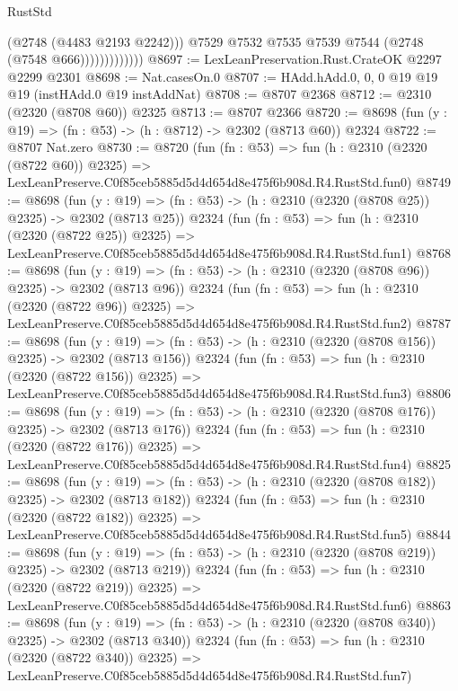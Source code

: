 \begin{lexlean}{RustStd}
\begin{coremodule}
                            (@2748 (@4483 @2193 @2242)))
                          @7529
                          @7532
                          @7535
                          @7539
                          @7544
                          (@2748 (@7548 @666)))))))))))))
@8697 := LexLeanPreservation.Rust.CrateOK @2297 @2299 @2301
@8698 := Nat.casesOn.{0}
@8707 := HAdd.hAdd.{0, 0, 0} @19 @19 @19 (instHAdd.{0} @19 instAddNat)
@8708 := @8707 @2368
@8712 := @2310 (@2320 (@8708 @60)) @2325
@8713 := @8707 @2366
@8720 := @8698 (fun (y : @19) => (fn : @53) -> (h : @8712) -> @2302 (@8713 @60)) @2324
@8722 := @8707 Nat.zero
@8730 := @8720
    (fun (fn : @53) =>
    fun (h : @2310 (@2320 (@8722 @60)) @2325) =>
    LexLeanPreserve.C0f85ceb5885d5d4d654d8e475f6b908d.R4.RustStd.fun0)
@8749 := @8698
    (fun (y : @19) => (fn : @53) -> (h : @2310 (@2320 (@8708 @25)) @2325) -> @2302 (@8713 @25))
    @2324
    (fun (fn : @53) =>
    fun (h : @2310 (@2320 (@8722 @25)) @2325) =>
    LexLeanPreserve.C0f85ceb5885d5d4d654d8e475f6b908d.R4.RustStd.fun1)
@8768 := @8698
    (fun (y : @19) => (fn : @53) -> (h : @2310 (@2320 (@8708 @96)) @2325) -> @2302 (@8713 @96))
    @2324
    (fun (fn : @53) =>
    fun (h : @2310 (@2320 (@8722 @96)) @2325) =>
    LexLeanPreserve.C0f85ceb5885d5d4d654d8e475f6b908d.R4.RustStd.fun2)
@8787 := @8698
    (fun (y : @19) => (fn : @53) -> (h : @2310 (@2320 (@8708 @156)) @2325) -> @2302 (@8713 @156))
    @2324
    (fun (fn : @53) =>
    fun (h : @2310 (@2320 (@8722 @156)) @2325) =>
    LexLeanPreserve.C0f85ceb5885d5d4d654d8e475f6b908d.R4.RustStd.fun3)
@8806 := @8698
    (fun (y : @19) => (fn : @53) -> (h : @2310 (@2320 (@8708 @176)) @2325) -> @2302 (@8713 @176))
    @2324
    (fun (fn : @53) =>
    fun (h : @2310 (@2320 (@8722 @176)) @2325) =>
    LexLeanPreserve.C0f85ceb5885d5d4d654d8e475f6b908d.R4.RustStd.fun4)
@8825 := @8698
    (fun (y : @19) => (fn : @53) -> (h : @2310 (@2320 (@8708 @182)) @2325) -> @2302 (@8713 @182))
    @2324
    (fun (fn : @53) =>
    fun (h : @2310 (@2320 (@8722 @182)) @2325) =>
    LexLeanPreserve.C0f85ceb5885d5d4d654d8e475f6b908d.R4.RustStd.fun5)
@8844 := @8698
    (fun (y : @19) => (fn : @53) -> (h : @2310 (@2320 (@8708 @219)) @2325) -> @2302 (@8713 @219))
    @2324
    (fun (fn : @53) =>
    fun (h : @2310 (@2320 (@8722 @219)) @2325) =>
    LexLeanPreserve.C0f85ceb5885d5d4d654d8e475f6b908d.R4.RustStd.fun6)
@8863 := @8698
    (fun (y : @19) => (fn : @53) -> (h : @2310 (@2320 (@8708 @340)) @2325) -> @2302 (@8713 @340))
    @2324
    (fun (fn : @53) =>
    fun (h : @2310 (@2320 (@8722 @340)) @2325) =>
    LexLeanPreserve.C0f85ceb5885d5d4d654d8e475f6b908d.R4.RustStd.fun7)

\end{coremodule}
\end{lexlean}
